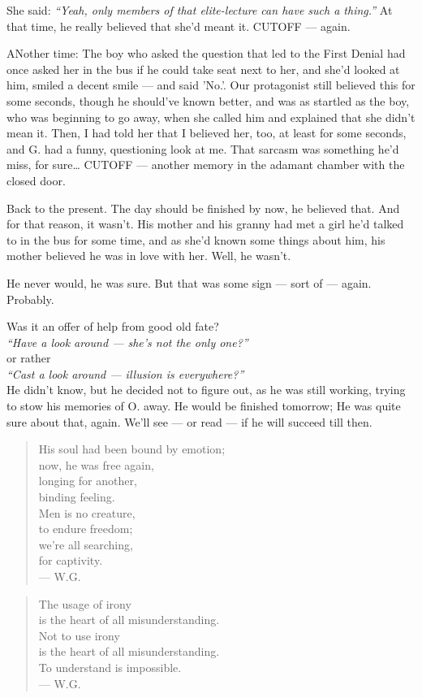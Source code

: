 She said: \emph{\enquote{Yeah, only members of that elite-lecture can have such a thing.}}
At that time, he really believed that she'd meant it. 
CUTOFF --- again.

ANother time: The boy who asked the question that led to the First Denial had once asked her in the bus if he could take seat next to her, and she'd looked at him, smiled a decent smile --- and said 'No.'.
Our protagonist still believed this for some seconds, though he should've known better, and was as startled as the boy, who was beginning to go away, when she called him and explained that she didn't mean it. Then, I had told her that I believed her, too, at least for some seconds, and G. had a funny, questioning look at me. 
That sarcasm was something he'd miss, for sure\dots{}
CUTOFF --- another memory in the adamant chamber with the closed door.

Back to the present. 
The day should be finished by now, he believed that. 
And for that reason, it wasn't. 
His mother and his granny had met a girl he'd talked to in the bus for some time, and as she'd known some things about him, his mother believed he was in love with her. 
Well, he wasn't. 

He never would, he was sure. 
But that was some sign --- sort of --- again. 
Probably.

Was it an offer of help from good old fate?\\
\emph{\enquote{Have a look around --- she's not the only one?}}\\
    or rather\\
\emph{\enquote{Cast a look around --- illusion is everywhere?}}\\
He didn't know, but he decided not to figure out, as he was still working, trying to stow his memories of O. away. 
He would be finished tomorrow; He was quite sure about that, again. 
We'll see --- or read --- if he will succeed till then. 

\begin{quote}
His soul had been bound by emotion;\\
now, he was free again,\\
longing for another,\\
binding feeling. \\
Men is no creature,\\
to endure freedom;\\
we're all searching,\\
for captivity. \\
--- W.G.
\end{quote}

\begin{quote}
The usage of irony\\
is the heart of all misunderstanding. \\
Not to use irony\\
is the heart of all misunderstanding. \\
To understand is impossible. \\
--- W.G.
\end{quote}
